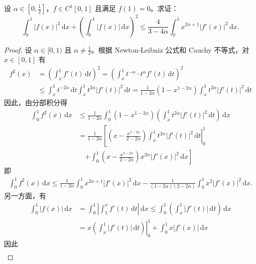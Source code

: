 \documentclass[../../main.tex]{subfiles}
\begin{document}
\begin{example}
设 \( \alpha \in \left[0, \frac{1}{2}\right] \)，\( f \in C^1[0,1] \) 且满足 \( f(1) = 0 \)。求证：
\[
\int_{0}^{1} |f(x)|^2 \, \mathrm{d}x + \left( \int_{0}^{1} |f(x)| \, \mathrm{d}x \right)^2 \leqslant \frac{4}{3 - 4\alpha} \int_{0}^{1} x^{2\alpha + 1} |f'(x)|^2 \, \mathrm{d}x.
\]
\end{example}
\begin{proof}
设 \( \alpha \in [0,1) \) 且 \( \alpha \neq \frac{1}{2} \)。根据 Newton-Leibniz 公式和 Cauchy 不等式，对 \( x \in [0,1] \) 有
\begin{align*}
f^2(x) &= \left( \int_{x}^{1} f'(t) \, \mathrm{d}t \right)^2 = \left( \int_{x}^{1} t^{-\alpha} \cdot t^{\alpha} f'(t) \, \mathrm{d}t \right)^2 \\
&\leqslant \int_{x}^{1} t^{-2\alpha} \, \mathrm{d}t \int_{x}^{1} t^{2\alpha} |f'(t)|^2 \, \mathrm{d}t = \frac{1}{1 - 2\alpha} (1 - x^{1 - 2\alpha}) \int_{x}^{1} t^{2\alpha} |f'(t)|^2 \, \mathrm{d}t
\end{align*}
因此，由分部积分得
\begin{align*}
\int_{0}^{1} f^2(x) \, \mathrm{d}x &\leqslant \frac{1}{1 - 2\alpha} \int_{0}^{1} (1 - x^{1 - 2\alpha}) \left( \int_{x}^{1} t^{2\alpha} |f'(t)|^2 \, \mathrm{d}t \right) \, \mathrm{d}x \\
&= \frac{1}{1 - 2\alpha} \left[ \left. \left( x - \frac{x^{2 - 2\alpha}}{2 - 2\alpha} \right) \int_{x}^{1} t^{2\alpha} |f'(t)|^2 \, \mathrm{d}t \right|_{0}^{1} \right. \\
&\quad \left. + \int_{0}^{1} \left( x - \frac{x^{2 - 2\alpha}}{2 - 2\alpha} \right) x^{2\alpha} |f'(x)|^2 \, \mathrm{d}x \right]
\end{align*}
即
\begin{align}
\int_{0}^{1} f^2(x) \, \mathrm{d}x \leqslant \frac{1}{1 - 2\alpha} \int_{0}^{1} x^{2\alpha + 1} |f'(x)|^2 \, \mathrm{d}x - \frac{1}{(1 - 2\alpha)(2 - 2\alpha)} \int_{0}^{1} x^2 |f'(x)|^2 \, \mathrm{d}x .\label{5.1.5}
\end{align}
另一方面，有
\begin{align*}
\int_{0}^{1} |f(x)| \, \mathrm{d}x &= \int_{0}^{1} \left| \int_{1}^{x} f'(t) \, \mathrm{d}t \right| \, \mathrm{d}x \leqslant \int_{0}^{1} \left( \int_{x}^{1} |f'(t)| \, \mathrm{d}t \right) \, \mathrm{d}x \\
&= \left. x \left( \int_{x}^{1} |f'(t)| \, \mathrm{d}t \right) \right|_{0}^{1} + \int_{0}^{1} x |f'(x)| \, \mathrm{d}x
\end{align*}
因此
\begin{align}

\end{align}
\end{proof}
\end{document}

